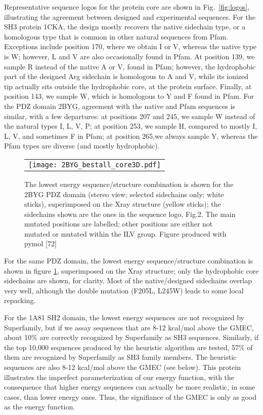 Representative sequence logos for the protein core are shown in Fig.\ \ref{fig:logos}, illustrating the agreement between designed and experimental sequences. For the SH3 protein 1CKA, the design mostly recovers the native sidechain type, or a homologous type that is common in other natural sequences from Pfam. Exceptions include position 170, where we obtain I or V, whereas the native type is W; however, L and V are also occasionally found in Pfam. At position 139, we sample R instead of the native A or V, found in Pfam; however, the hydrophobic part of the designed Arg sidechain is homologous to A and V, while its ionized tip actually sits outside the hydrophobic core, at the protein surface. Finally, at position 143, we sample W, which is homologous to Y and F found in Pfam. For the PDZ domain 2BYG, agreement with the native and Pfam sequences is similar, with a few departures: at positions 207 and 245, we sample W instead of the natural types I, L, V, P; at position 253, we sample H, compared to mostly I, L, V, and sometimes F in Pfam; at position 265,we always sample Y, whereas the Pfam types are diverse (and mostly hydrophobic).

    \begin{figure}[!htbp]
      \centering
      \begin{tabular}{c}
        \texttt{[image: 2BYG\_bestall\_core3D.pdf]} 
      \end{tabular}      
      \caption{The lowest energy sequence/structure combination is shown for the 2BYG PDZ domain (stereo view; selected sidechains only; white sticks), superimposed on the Xray structure (yellow sticks); the sidechains shown are the ones in the sequence logo, Fig.2. The main mutated positions are labelled; other positions are either not mutated or mutated within the ILV group. Figure produced with pymol [72]}
      \label{fig:3Dstruct}
    \end{figure}
For the same PDZ domain, the lowest energy sequence/structure combination is shown in figure \ref{fig:3Dstruct}, superimposed on the Xray structure; only the hydrophobic core sidechains are shown, for clarity. Most of the native/designed sidechains overlap very well, although the double mutation (F205L, L245W) leads to some local repacking.

    For the 1A81 SH2 domain, the lowest energy sequences are not recognized by Superfamily, but if we assay sequences that are 8-12 kcal/mol above the GMEC, about 10\% are correctly recognized by Superfamily as SH3 sequences. Similarly, if the top 10,000 sequences produced by the heuristic algorithm are tested, 57\% of them are recognized by Superfamily as SH3 family members. The heuristic sequences are also 8-12 kcal/mol above the GMEC (see below). This protein illustrates the imperfect parameterization of our energy function, with the consequence that higher energy sequences can actually be more realistic, in some cases, than lower energy ones. Thus, the signifiance of the GMEC is only as good as the energy function.


